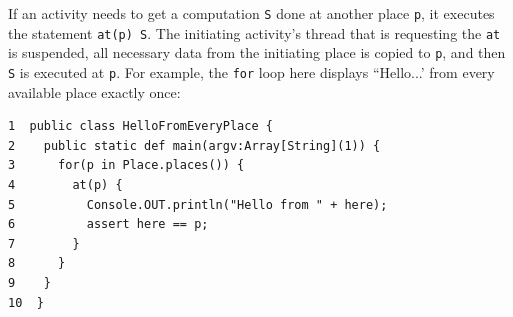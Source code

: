 
If an activity needs to get a computation {\tt S} done at another place {\tt p},
it executes the statement {\tt at(p) S}.  The initiating activity's thread that 
is requesting the {\tt at} is suspended, all necessary data from the initiating 
place is copied to {\tt p}, and then {\tt S} is executed at {\tt p}.  For
example, the {\tt for} loop here displays ``Hello...' from every available
place exactly once:
\begin{verbatim}
1  public class HelloFromEveryPlace {
2    public static def main(argv:Array[String](1)) {
3      for(p in Place.places()) { 
4        at(p) {
5          Console.OUT.println("Hello from " + here); 
6          assert here == p;
7        }
8      }
9    }
10  }
\end{verbatim}

